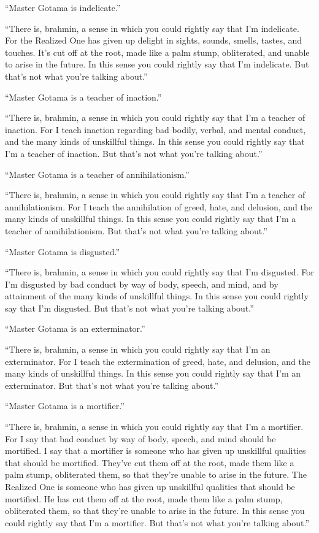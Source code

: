 \documentclass[12pt,openany]{book}%
\begin{document}
“Master Gotama is indelicate.” 

“There is, brahmin, a sense in which you could rightly say that I’m indelicate. For the Realized One has given up delight in sights, sounds, smells, tastes, and touches. It’s cut off at the root, made like a palm stump, obliterated, and unable to arise in the future. In this sense you could rightly say that I’m indelicate. But that’s not what you’re talking about.” 

“Master Gotama is a teacher of inaction.” 

“There is, brahmin, a sense in which you could rightly say that I’m a teacher of inaction. For I teach inaction regarding bad bodily, verbal, and mental conduct, and the many kinds of unskillful things. In this sense you could rightly say that I’m a teacher of inaction. But that’s not what you’re talking about.” 

“Master Gotama is a teacher of annihilationism.” 

“There is, brahmin, a sense in which you could rightly say that I’m a teacher of annihilationism. For I teach the annihilation of greed, hate, and delusion, and the many kinds of unskillful things. In this sense you could rightly say that I’m a teacher of annihilationism. But that’s not what you’re talking about.” 

“Master Gotama is disgusted.” 

“There is, brahmin, a sense in which you could rightly say that I’m disgusted. For I’m disgusted by bad conduct by way of body, speech, and mind, and by attainment of the many kinds of unskillful things. In this sense you could rightly say that I’m disgusted. But that’s not what you’re talking about.” 

“Master Gotama is an exterminator.” 

“There is, brahmin, a sense in which you could rightly say that I’m an exterminator. For I teach the extermination of greed, hate, and delusion, and the many kinds of unskillful things. In this sense you could rightly say that I’m an exterminator. But that’s not what you’re talking about.” 

“Master Gotama is a mortifier.” 

“There is, brahmin, a sense in which you could rightly say that I’m a mortifier. For I say that bad conduct by way of body, speech, and mind should be mortified. I say that a mortifier is someone who has given up unskillful qualities that should be mortified. They’ve cut them off at the root, made them like a palm stump, obliterated them, so that they’re unable to arise in the future. The Realized One is someone who has given up unskillful qualities that should be mortified. He has cut them off at the root, made them like a palm stump, obliterated them, so that they’re unable to arise in the future. In this sense you could rightly say that I’m a mortifier. But that’s not what you’re talking about.” 
\end{document}
